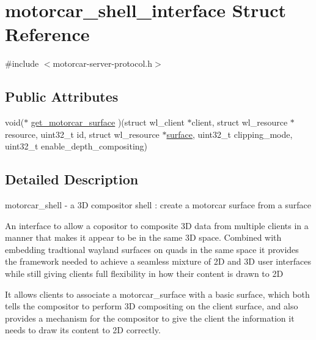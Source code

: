 \hypertarget{structmotorcar__shell__interface}{\section{motorcar\-\_\-shell\-\_\-interface Struct Reference}
\label{structmotorcar__shell__interface}
}


{\ttfamily \#include $<$motorcar-\/server-\/protocol.\-h$>$}

\subsection*{Public Attributes}
\begin{DoxyCompactItemize}
\item 
void($\ast$ \hyperlink{structmotorcar__shell__interface_af2f516fa4585245d6b7db1fbec34419e}{get\-\_\-motorcar\-\_\-surface} )(struct wl\-\_\-client $\ast$client, struct wl\-\_\-resource $\ast$resource, uint32\-\_\-t id, struct wl\-\_\-resource $\ast$\hyperlink{simple-egl_8cpp_a0720952aa1caded45b5bcdce589663a9}{surface}, uint32\-\_\-t clipping\-\_\-mode, uint32\-\_\-t enable\-\_\-depth\-\_\-compositing)
\end{DoxyCompactItemize}


\subsection{Detailed Description}
motorcar\-\_\-shell -\/ a 3\-D compositor shell \-: create a motorcar surface from a surface

An interface to allow a copositor to composite 3\-D data from multiple clients in a manner that makes it appear to be in the same 3\-D space. Combined with embedding tradtional wayland surfaces on quads in the same space it provides the framework needed to achieve a seamless mixture of 2\-D and 3\-D user interfaces while still giving clients full flexibility in how their content is drawn to 2\-D

It allows clients to associate a motorcar\-\_\-surface with a basic surface, which both tells the compositor to perform 3\-D compositing on the client surface, and also provides a mechanism for the compositor to give the client the information it needs to draw its content to 2\-D correctly. 


